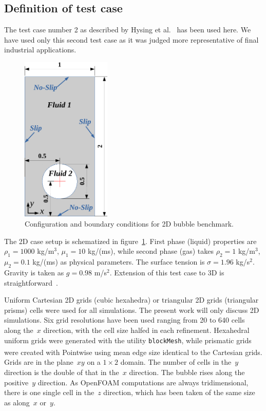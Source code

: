 \documentclass[review]{elsarticle}
\begin{document}
\subsection{Definition of test case}\label{sec_hysingcasedef}
The test case number 2 as described by Hysing et al.~\cite{Hysing2009} has been used here. We have used only this second test case as it was judged more representative of final industrial applications. 
\begin{figure}[!h]
\begin{center}
 \vspace{-1mm}
 \includegraphics[width=4.25cm]{figures/benchmark_scheme.pdf}
 \vspace{-7mm}
\end{center}
\caption{Configuration and boundary conditions for 2D bubble benchmark.}
\label{benchmark_scheme}
\end{figure}
The 2D case setup is schematized in figure~\ref{benchmark_scheme}. First phase (liquid) properties are $\rho_1=1000$ kg/m$^3$, $\mu_1=10$ kg/(ms), while second phase (gas) takes $\rho_2=1$ kg/m$^3$, $\mu_2=0.1$ kg/(ms) as physical parameters. The surface tension is $\sigma=1.96$ kg/s$^2$. Gravity is taken as $g=0.98$ m/s$^2$. Extension of this test case to 3D is straightforward~\cite{Adelsberger2014}.

Uniform Cartesian 2D grids (cubic hexahedra) or triangular 2D grids (triangular prisms) cells were used for all simulations. The present work will only discuss 2D simulations. Six grid resolutions have been used ranging from 20 to 640 cells along the~$x$ direction, with the cell size halfed in each refinement. Hexahedral uniform grids were generated with the utility \verb+blockMesh+, while prismatic grids were created with Pointwise\textsuperscript{\textregistered} using mean edge size identical to the Cartesian grids. Grids are in the plane~$xy$ on a $1\times 2$ domain. The number of cells in the~$y$ direction is the double of that in the~$x$ direction. The bubble rises along the positive~$y$ direction. As OpenFOAM computations are always tridimensional, there is one single cell in the~$z$ direction, which has been taken of the same size as along~$x$ or~$y$.
\end{document}
